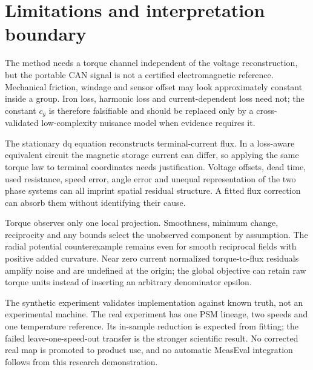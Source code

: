 \section{Limitations and interpretation boundary}
The method needs a torque channel independent of the voltage reconstruction,
but the portable CAN signal is not a certified electromagnetic reference.
Mechanical friction, windage and sensor offset may look approximately constant
inside a group. Iron loss, harmonic loss and current-dependent loss need not;
the constant $c_g$ is therefore falsifiable and should be replaced only by a
cross-validated low-complexity nuisance model when evidence requires it.

The stationary dq equation reconstructs terminal-current flux. In a loss-aware
equivalent circuit the magnetic storage current can differ, so applying the
same torque law to terminal coordinates needs justification. Voltage offsets,
dead time, used resistance, speed error, angle error and unequal representation
of the two phase systems can all imprint spatial residual structure. A fitted
flux correction can absorb them without identifying their cause.

Torque observes only one local projection. Smoothness, minimum change,
reciprocity and any bounds select the unobserved component by assumption. The
radial potential counterexample remains even for smooth reciprocal fields with
positive added curvature. Near zero current normalized torque-to-flux residuals
amplify noise and are undefined at the origin; the global objective can retain
raw torque units instead of inserting an arbitrary denominator epsilon.

The synthetic experiment validates implementation against known truth, not an
experimental machine. The real experiment has one PSM lineage, two speeds and
one temperature reference. Its in-sample reduction is expected from fitting;
the failed leave-one-speed-out transfer is the stronger scientific result.
No corrected real map is promoted to product use, and no automatic MeasEval
integration follows from this research demonstration.
